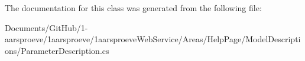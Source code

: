 The documentation for this class was generated from the following file\+:\begin{DoxyCompactItemize}
\item 
Documents/\+Git\+Hub/1-\/aarsproeve/1aarsproeve/1aarsproeve\+Web\+Service/\+Areas/\+Help\+Page/\+Model\+Descriptions/Parameter\+Description.\+cs\end{DoxyCompactItemize}
